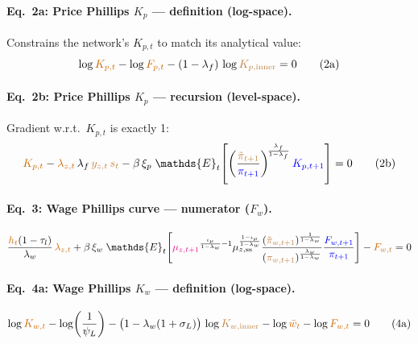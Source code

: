 \documentclass[11pt]{article}
\begin{document}
\paragraph{Eq.~2a: Price Phillips $K_p$ --- definition (log-space).}
Constrains the network's $K_{p,t}$ to match its analytical value:
\begin{equation}
  \log\textcolor{orange!80!black}{K_{p,t}}
  - \log\textcolor{orange!80!black}{F_{p,t}}
  - (1 - \lambda_f)\,\log\textcolor{brown}{K_{p,\text{inner}}} = 0
  \tag{2a}
\end{equation}

\paragraph{Eq.~2b: Price Phillips $K_p$ --- recursion (level-space).}
Gradient w.r.t.\ $K_{p,t}$ is exactly 1:
\begin{equation}
  \textcolor{orange!80!black}{K_{p,t}}
  - \textcolor{orange!80!black}{\lambda_{z,t}}\,\lambda_f\,
    \textcolor{brown}{y_{z,t}}\,\textcolor{brown}{s_t}
  - \beta\,\xi_p\;\mathds{E}_t\!\left[
    \left(\frac{\textcolor{brown}{\tilde\pi_{t+1}}}{\textcolor{blue}{\pi_{t+1}}}\right)^{\!\frac{\lambda_f}{1-\lambda_f}}
    \textcolor{blue}{K_{p,t+1}}
  \right] = 0
  \tag{2b}
\end{equation}

\paragraph{Eq.~3: Wage Phillips curve --- numerator ($F_w$).}
\begin{equation}
  \frac{\textcolor{orange!80!black}{h_t}(1-\tau_l)}{\lambda_w}\,\textcolor{orange!80!black}{\lambda_{z,t}}
  + \beta\,\xi_w\;\mathds{E}_t\!\left[
    \textcolor{magenta}{\mu_{z,t+1}}^{\frac{\iota_\mu}{1-\lambda_w}-1}
    \mu_{z,\text{ss}}^{\frac{1-\iota_\mu}{1-\lambda_w}}
    \frac{(\textcolor{brown}{\tilde\pi_{w,t+1}})^{\frac{1}{1-\lambda_w}}}
         {(\textcolor{brown}{\pi_{w,t+1}})^{\frac{\lambda_w}{1-\lambda_w}}}
    \frac{\textcolor{blue}{F_{w,t+1}}}{\textcolor{blue}{\pi_{t+1}}}
  \right]
  - \textcolor{orange!80!black}{F_{w,t}} = 0
\end{equation}

\paragraph{Eq.~4a: Wage Phillips $K_w$ --- definition (log-space).}
\begin{equation}
  \log\textcolor{orange!80!black}{K_{w,t}}
  - \log\!\left(\frac{1}{\psi_L}\right)
  - \bigl(1 - \lambda_w(1+\sigma_L)\bigr)\,\log\textcolor{brown}{K_{w,\text{inner}}}
  - \log\textcolor{orange!80!black}{\tilde{w}_t}
  - \log\textcolor{orange!80!black}{F_{w,t}} = 0
  \tag{4a}
\end{equation}
\end{document}
